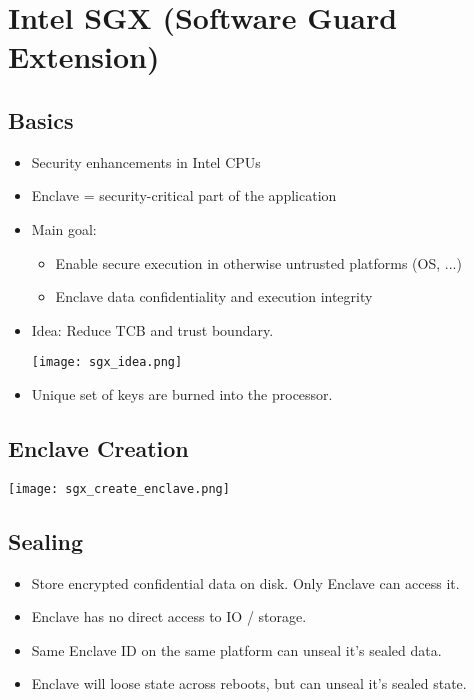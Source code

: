 
\section{Intel SGX (Software Guard Extension)}
\subsection{Basics}
\begin{itemize}
  \item Security enhancements in Intel CPUs
  \item Enclave = security-critical part of the application
  \item Main goal:
    \begin{itemize}
      \item Enable secure execution in otherwise untrusted platforms (OS, ...)
      \item Enclave data confidentiality and execution integrity
    \end{itemize}
  \item Idea: Reduce TCB and trust boundary.
    \begin{center}
      \texttt{[image: sgx\_idea.png]}
    \end{center}
  \item Unique set of keys are burned into the processor.
\end{itemize}

\subsection{Enclave Creation}
\begin{center}
  \texttt{[image: sgx\_create\_enclave.png]}
\end{center}

\subsection{Sealing}
\begin{itemize}
  \item Store encrypted confidential data on disk. Only Enclave can access it.
  \item Enclave has no direct access to IO / storage.
  \item Same Enclave ID on the same platform can unseal it's sealed data.
  \item Enclave will loose state across reboots, but can unseal it's sealed
    state.
\end{itemize}



